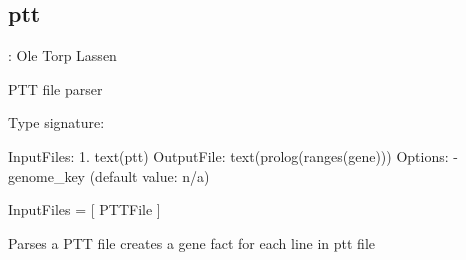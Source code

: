 


\subsection{ptt}

\label{sec:ptt}

\begin{tags}
: Ole Torp Lassen
\end{tags}

PTT file parser\vspace{0.7cm}

\begin{description}
Type signature:

\begin{code}
InputFiles:
    1. text(ptt)
OutputFile:
    text(prolog(ranges(gene)))
Options:
    - genome_key (default value: n/a)
\end{code}

\begin{code}
InputFiles = [ PTTFile ]
\end{code}

Parses a PTT file creates a gene fact for each line in ptt file
\end{description}

